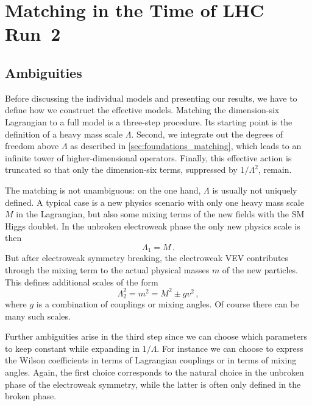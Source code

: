 \section{Matching in the Time of LHC Run~2}
\label{sec:validity_matching}

\subsection{Ambiguities}
\label{sec:validity_matching_ambiguities}

Before discussing the individual models and presenting our results, we
have to define how we construct the effective models.  Matching the
dimension-six Lagrangian to a full model is a three-step procedure.
Its starting point is the definition of a heavy mass scale $\Lambda$.
Second, we integrate out the degrees of freedom above $\Lambda$ as
described in \autoref{sec:foundations_matching}, which leads to an
infinite tower of higher-dimensional operators.  Finally, this
effective action is truncated so that only the dimension-six terms,
suppressed by $1 / \Lambda^2$, remain.

The matching is not unambiguous: on the one hand, $\Lambda$ is usually
not uniquely defined. A typical case is a new physics scenario with
only one heavy mass scale $M$ in the Lagrangian, but also some mixing
terms of the new fields with the SM Higgs doublet. In the unbroken
electroweak phase the only new physics scale is then
%
\begin{equation}
  \Lambda_1 = M \,.
\end{equation}
%
But after electroweak symmetry breaking, the electroweak VEV
contributes through the mixing term to the actual physical masses $m$
of the new particles. This defines additional scales of the form
%
\begin{equation}
  \Lambda_2^2 = m^2 = M^2 \pm g v^2 \,,
\end{equation}
%
where $g$ is a combination of couplings or mixing angles. Of course
there can be many such scales.

Further ambiguities arise in the third step since we can choose which
parameters to keep constant while expanding in $1/\Lambda$. For
instance we can choose to express the Wilson coefficients in terms of
Lagrangian couplings or in terms of mixing angles. Again, the first
choice corresponds to the natural choice in the unbroken phase of the
electroweak symmetry, while the latter is often only defined in the
broken phase.

